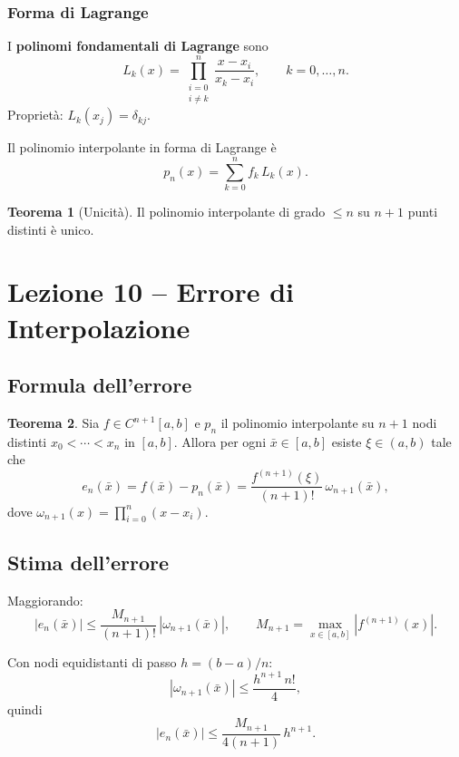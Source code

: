 \documentclass[12pt,a4paper]{article}
\theoremstyle{definition}
\newtheorem{teorema}{Teorema}[section]
\begin{document}
\subsubsection{Forma di Lagrange}

I \textbf{polinomi fondamentali di Lagrange} sono
\[
  L_k(x) = \prod_{\substack{i=0 \\ i \neq k}}^{n} \frac{x - x_i}{x_k - x_i}, \qquad k = 0, \ldots, n.
\]
Proprietà: $L_k(x_j) = \delta_{kj}$.

Il polinomio interpolante in forma di Lagrange è
\[
  p_n(x) = \sum_{k=0}^{n} f_k\, L_k(x).
\]

\begin{teorema}[Unicità]
Il polinomio interpolante di grado $\leq n$ su $n+1$ punti distinti è unico.
\end{teorema}

\section{Lezione 10 -- Errore di Interpolazione}

\subsection{Formula dell'errore}

\begin{teorema}
Sia $f \in C^{n+1}[a,b]$ e $p_n$ il polinomio interpolante su $n+1$ nodi distinti $x_0 < \cdots < x_n$ in $[a,b]$. Allora per ogni $\bar{x} \in [a,b]$ esiste $\xi \in (a,b)$ tale che
\[
  e_n(\bar{x}) = f(\bar{x}) - p_n(\bar{x}) = \frac{f^{(n+1)}(\xi)}{(n+1)!}\,\omega_{n+1}(\bar{x}),
\]
dove $\omega_{n+1}(x) = \prod_{i=0}^{n}(x - x_i)$.
\end{teorema}

\subsection{Stima dell'errore}

Maggiorando:
\[
  |e_n(\bar{x})| \leq \frac{M_{n+1}}{(n+1)!}\,|\omega_{n+1}(\bar{x})|, \qquad
  M_{n+1} = \max_{x \in [a,b]} |f^{(n+1)}(x)|.
\]

Con nodi equidistanti di passo $h = (b-a)/n$:
\[
  |\omega_{n+1}(\bar{x})| \leq \frac{h^{n+1}\,n!}{4},
\]
quindi
\[
  |e_n(\bar{x})| \leq \frac{M_{n+1}}{4(n+1)}\,h^{n+1}.
\]
\end{document}
